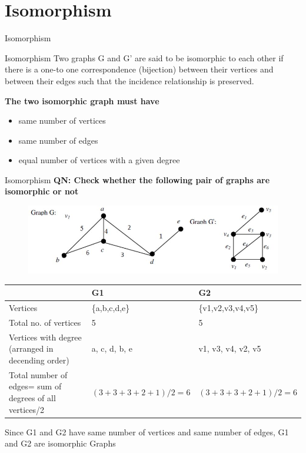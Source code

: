 \documentclass{beamer}
\begin{document}
\section{Isomorphism}
\begin{frame}{Isomorphism}
	\begin{block}{Isomorphism}
		Two graphs G and G' are said to be isomorphic to each other if there is a one-to one
		correspondence (bijection) between their vertices and between their edges such that the incidence 
		relationship is preserved.
	\end{block}
\textbf{The two isomorphic graph must have}
\begin{itemize}
	\item same number of vertices
	\item same number of edges
	\item equal number of vertices with a given degree
\end{itemize}
\end{frame}
\begin{frame}{Isomorphism}
	\textbf{QN: Check whether the following pair of graphs are 
		isomorphic or not}
	\begin{figure}
		\includegraphics[scale=.4]{img/m20}
	\end{figure}
\begin{small}
	\begin{table}
		\begin{tabular}{| p{4cm} | p{3cm} | p{3cm} |}
			\hline
			& G1 & G2\\ \hline
			Vertices & \{a,b,c,d,e\} & \{v1,v2,v3,v4,v5\}\\ \hline 
			Total no. of vertices & 5 & 5\\ \hline 
			Vertices with degree 
			(arranged in
			decending order) &
			a, c, d, b, e & v1, v3, v4, v2, v5\\\hline
			Total number of edges= 
			sum of
			degrees of all vertices/2 & $(3+3+3+2+1)/2=6$ & $(3+3+3+2+1)/2=6$\\
			\hline
		\end{tabular}
	\end{table}
Since G1 and G2 have same number of vertices and same number of edges, G1 and G2 are
isomorphic Graphs
\end{small}
\end{frame}
\end{document}
